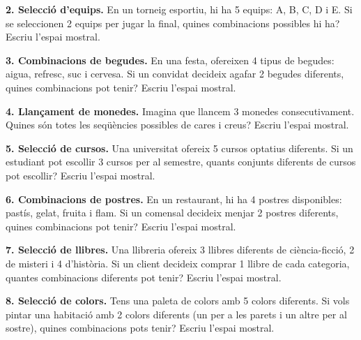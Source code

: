 \documentclass[12pt]{article}
\begin{document}
\begin{exercici} \noindent 
\textbf{2. Selecció d'equips.} En un torneig esportiu, hi ha 5 equips: A, B, C, D i E. Si se seleccionen 2 equips per jugar la final, quines combinacions possibles hi ha? Escriu l'espai mostral.
\end{exercici}

\begin{exercici} \noindent 
\textbf{3. Combinacions de begudes.} En una festa, ofereixen 4 tipus de begudes: aigua, refresc, suc i cervesa. Si un convidat decideix agafar 2 begudes diferents, quines combinacions pot tenir? Escriu l'espai mostral.
\end{exercici}

\begin{exercici} \noindent 
\textbf{4. Llançament de monedes.} Imagina que llancem 3 monedes consecutivament. Quines són totes les seqüències possibles de cares i creus? Escriu l'espai mostral.
\end{exercici}

\begin{exercici} \noindent 
\textbf{5. Selecció de cursos.} Una universitat ofereix 5 cursos optatius diferents. Si un estudiant pot escollir 3 cursos per al semestre, quants conjunts diferents de cursos pot escollir? Escriu l'espai mostral.
\end{exercici}

\begin{exercici} \noindent 
\textbf{6. Combinacions de postres.} En un restaurant, hi ha 4 postres disponibles: pastís, gelat, fruita i flam. Si un comensal decideix menjar 2 postres diferents, quines combinacions pot tenir? Escriu l'espai mostral.
\end{exercici}

\begin{exercici} \noindent 
\textbf{7. Selecció de llibres.} Una llibreria ofereix 3 llibres diferents de ciència-ficció, 2 de misteri i 4 d'història. Si un client decideix comprar 1 llibre de cada categoria, quantes combinacions diferents pot tenir? Escriu l'espai mostral.
\end{exercici}

\begin{exercici} \noindent 
\textbf{8. Selecció de colors.} Tens una paleta de colors amb 5 colors diferents. Si vols pintar una habitació amb 2 colors diferents (un per a les parets i un altre per al sostre), quines combinacions pots tenir? Escriu l'espai mostral.
\end{exercici}
\end{document}
